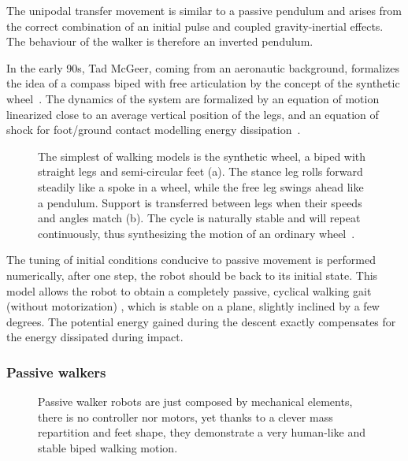 The unipodal transfer movement is similar to a passive pendulum and arises from the correct combination of an initial pulse and coupled gravity-inertial effects. The behaviour of the walker is therefore an inverted pendulum.

In the early 90s, Tad McGeer, coming from an aeronautic background, formalizes the idea of a compass biped with free articulation by the concept of the synthetic wheel~\parencite{mcgeer1990passive}.
The dynamics of the system are formalized by an equation of motion linearized close to an average vertical position of the legs, and an equation of shock for foot/ground contact modelling energy dissipation~\parencite{mcgeer1992principles}.

\begin{figure}[tb]
\centering
    \hfil
    \caption{The simplest of walking models is the synthetic wheel, a biped with straight legs and semi-circular feet (a). The stance leg rolls forward steadily like a spoke in a wheel, while the free leg swings ahead like a pendulum. Support is transferred between legs when their speeds and angles match (b). The cycle is naturally stable and will repeat continuously, thus synthesizing the motion of an ordinary wheel~\parencite{mcgeer1992principles}.}
    \label{fig:synthetic-wheel}
\end{figure}


The tuning of initial conditions conducive to passive movement is performed numerically, after one step, the robot should be back to its initial state. This model allows the robot to obtain a completely passive, cyclical walking gait (without motorization) , which is stable on a plane, slightly inclined by a few degrees. The potential energy gained during the descent exactly compensates for the energy dissipated during impact.


\subsubsection{Passive walkers} %

\begin{figure}[tb]
\centering
    \hfil
    \caption{Passive walker robots are just composed by mechanical elements, there is no controller nor motors, yet thanks to a clever mass repartition and feet shape, they demonstrate a very human-like and stable biped walking motion.}
    \label{fig:mcgeer_work}
\end{figure}

